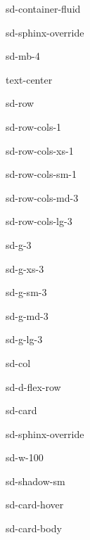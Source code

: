 \documentclass[letterpaper,10pt,english]{jupyterBook}
\begin{document}
\begin{sphinxuseclass}{sd-container-fluid}
\begin{sphinxuseclass}{sd-sphinx-override}
\begin{sphinxuseclass}{sd-mb-4}
\begin{sphinxuseclass}{text-center}
\begin{sphinxuseclass}{sd-row}
\begin{sphinxuseclass}{sd-row-cols-1}
\begin{sphinxuseclass}{sd-row-cols-xs-1}
\begin{sphinxuseclass}{sd-row-cols-sm-1}
\begin{sphinxuseclass}{sd-row-cols-md-3}
\begin{sphinxuseclass}{sd-row-cols-lg-3}
\begin{sphinxuseclass}{sd-g-3}
\begin{sphinxuseclass}{sd-g-xs-3}
\begin{sphinxuseclass}{sd-g-sm-3}
\begin{sphinxuseclass}{sd-g-md-3}
\begin{sphinxuseclass}{sd-g-lg-3}
\begin{sphinxuseclass}{sd-col}
\begin{sphinxuseclass}{sd-d-flex-row}
\begin{sphinxuseclass}{sd-card}
\begin{sphinxuseclass}{sd-sphinx-override}
\begin{sphinxuseclass}{sd-w-100}
\begin{sphinxuseclass}{sd-shadow-sm}
\begin{sphinxuseclass}{sd-card-hover}
\begin{sphinxuseclass}{sd-card-body}
\end{sphinxuseclass}{\hyperref[\detokenize{content/6_Sensoren::doc}]{}}
\end{sphinxuseclass}
\end{sphinxuseclass}
\end{sphinxuseclass}
\end{sphinxuseclass}
\end{sphinxuseclass}
\end{sphinxuseclass}
\end{sphinxuseclass}
\end{sphinxuseclass}
\end{sphinxuseclass}
\end{sphinxuseclass}
\end{sphinxuseclass}
\end{sphinxuseclass}
\end{sphinxuseclass}
\end{sphinxuseclass}
\end{sphinxuseclass}
\end{sphinxuseclass}
\end{sphinxuseclass}
\end{sphinxuseclass}
\end{sphinxuseclass}
\end{sphinxuseclass}
\end{sphinxuseclass}
\end{sphinxuseclass}
\begin{DUlineblock}{0em}
\item[] 
\end{DUlineblock}
\end{document}
